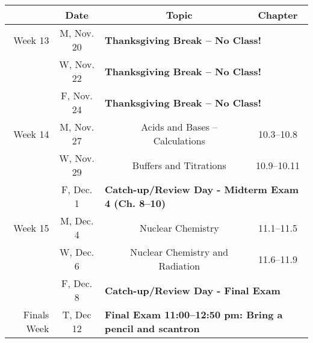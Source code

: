 \documentclass[12pt, letterpaper]{article}
\begin{document}
\noindent
\begin{tabular}{rcccc}
& Date && Topic & Chapter\\
\midrule
Week 13 & M, Nov. 20& \multicolumn{3}{l}{\textbf{Thanksgiving Break -- No Class!}}\\
& W, Nov. 22& \multicolumn{3}{l}{\textbf{Thanksgiving Break -- No Class!}}\\
& F, Nov. 24& \multicolumn{3}{l}{\textbf{Thanksgiving Break -- No Class!}}\\
\midrule
Week 14 & M, Nov. 27&& Acids and Bases -- Calculations & 10.3--10.8\\
& W, Nov. 29&& Buffers and Titrations & 10.9--10.11\\
& F, Dec. 1& \multicolumn{3}{l}{\textbf{Catch-up/Review Day - Midterm Exam 4 (Ch. 8--10)}}\\
\midrule
Week 15 & M, Dec. 4&& Nuclear Chemistry & 11.1--11.5\\
& W, Dec. 6&& Nuclear Chemistry and Radiation & 11.6--11.9\\
& F, Dec. 8& \multicolumn{3}{l}{\textbf{Catch-up/Review Day - Final Exam}}\\
\midrule
Finals Week& T, Dec 12& \multicolumn{3}{l}{\textbf{Final Exam 11:00--12:50 pm: Bring a pencil and scantron}}\\
\end{tabular}
\end{document}
